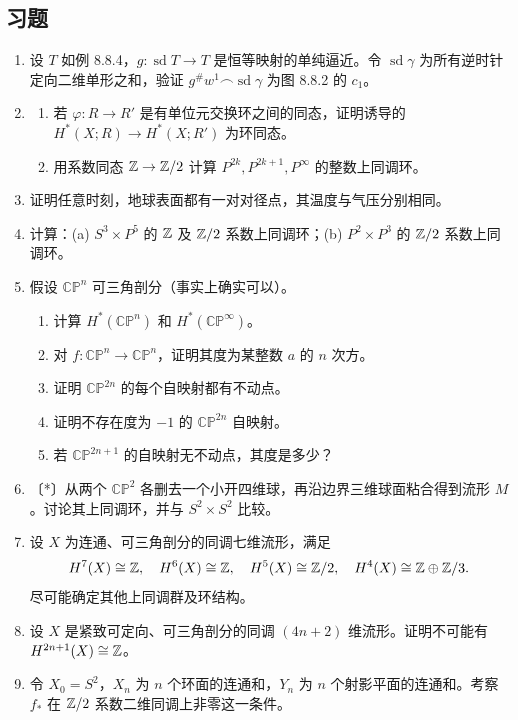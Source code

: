 \subsection*{习题}
\begin{enumerate}
\item 设 $T$ 如例 8.8.4，$g:\operatorname{sd}T\to T$ 是恒等映射的单纯逼近。令 $\operatorname{sd}\gamma$ 为所有逆时针定向二维单形之和，验证 $g^\#w^1\frown\operatorname{sd}\gamma$ 为图 8.8.2 的 $c_1$。
\item \begin{enumerate}[label=(\alph*)]
\item 若 $\varphi:R\to R'$ 是有单位元交换环之间的同态，证明诱导的 $H^*(X;R)\to H^*(X;R')$ 为环同态。
\item 用系数同态 $\mathbb{Z}\to\mathbb{Z}/2$ 计算 $P^{2k},P^{2k+1},P^\infty$ 的整数上同调环。
\end{enumerate}
\item 证明任意时刻，地球表面都有一对对径点，其温度与气压分别相同。
\item 计算：(a) $S^3\times P^5$ 的 $\mathbb{Z}$ 及 $\mathbb{Z}/2$ 系数上同调环；(b) $P^2\times P^3$ 的 $\mathbb{Z}/2$ 系数上同调环。
\item 假设 $\mathbb{CP}^n$ 可三角剖分（事实上确实可以）。
\begin{enumerate}[label=(\alph*)]
\item 计算 $H^*(\mathbb{CP}^n)$ 和 $H^*(\mathbb{CP}^\infty)$。
\item 对 $f:\mathbb{CP}^n\to\mathbb{CP}^n$，证明其度为某整数 $a$ 的 $n$ 次方。
\item 证明 $\mathbb{CP}^{2n}$ 的每个自映射都有不动点。
\item 证明不存在度为 $-1$ 的 $\mathbb{CP}^{2n}$ 自映射。
\item 若 $\mathbb{CP}^{2n+1}$ 的自映射无不动点，其度是多少？
\end{enumerate}
\item 〔*〕从两个 $\mathbb{CP}^2$ 各删去一个小开四维球，再沿边界三维球面粘合得到流形 $M$。讨论其上同调环，并与 $S^2\times S^2$ 比较。
\item 设 $X$ 为连通、可三角剖分的同调七维流形，满足
\[H^7(X)\cong\mathbb{Z},\quad H^6(X)\cong\mathbb{Z},\quad H^5(X)\cong\mathbb{Z}/2,\quad
H^4(X)\cong\mathbb{Z}\oplus\mathbb{Z}/3.\]
尽可能确定其他上同调群及环结构。
\item 设 $X$ 是紧致可定向、可三角剖分的同调 $(4n+2)$ 维流形。证明不可能有 $H^{2n+1}(X)\cong\mathbb{Z}$。
\item 令 $X_0=S^2$，$X_n$ 为 $n$ 个环面的连通和，$Y_n$ 为 $n$ 个射影平面的连通和。考察 $f_*$ 在 $\mathbb{Z}/2$ 系数二维同调上非零这一条件。

\end{enumerate}
